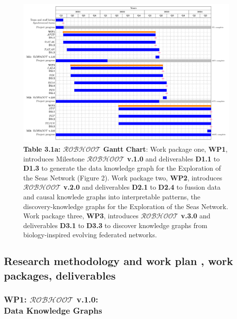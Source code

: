 \documentclass[11pt, a4paper]{article} %
\begin{document}
{\begin{figure}[h!]
   \includegraphics[width=1\textwidth]{Figures/GanttChart.pdf}
   \caption*{{\small {\bf Table 3.1a: $\mathcal{ROBHOOT}$ Gantt
         Chart}: Work package one, {\bf WP1}, introduces Milestone
       {\bf $\mathcal{ROBHOOT}$ v.1.0} and deliverables {\bf D1.1} to
       {\bf D1.3} to generate the data knowledge graph for the
       Exploration of the Seas Network (Figure 2). Work package two,
       {\bf WP2}, introduces {\bf $\mathcal{ROBHOOT}$ v.2.0} and
       deliverables {\bf D2.1} to {\bf D2.4} to fussion data and
       causal knowlede graphs into interpretable patterns, the
       discovery-knowledge graphs for the Exploration of the Seas
       Network. Work package three, {\bf WP3}, introduces {\bf
         $\mathcal{ROBHOOT}$ v.3.0} and deliverables {\bf D3.1} to
       {\bf D3.3} to discover knowledge graphs from biology-inspired
       evolving federated networks.}}
\end{figure}

  
\subsection{Research methodology and work plan , work packages,
  deliverables}

\subsubsection{{\bf WP1: $\mathcal{ROBHOOT}$ v.1.0}: \\ Data Knowledge
  Graphs}


}
\end{document}
